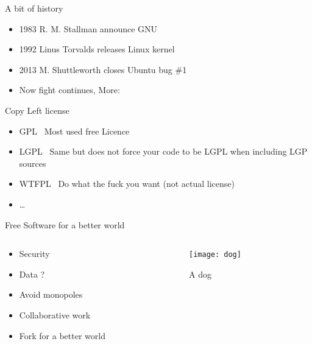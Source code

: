 \documentclass[xcolor={usenames,dvipsnames}]{beamer}
\begin{document}
\begin{frame}{A bit of history}
    \begin{itemize}[<+->]
        \item 1983 R. M. Stallman announce GNU~\cite{RMSWeb}
        \item 1992 Linus Torvalds releases Linux kernel~\cite{Linux}
        \item 2013 M. Shuttleworth closes Ubuntu bug \#1~\cite{Bug1}
        \item Now fight continues, More:~\cite{fsfVideo}
    \end{itemize}
\end{frame}

\begin{frame}{Copy Left license}
    \begin{itemize}[<+->]
        \item GPL~\cite{GPL} Most used free Licence
        \item LGPL~\cite{LGPL} Same but does not force your code to be LGPL when including LGP sources
        \item WTFPL~\cite{WTFPL} Do what the fuck you want (not actual license)
        \item \dots
    \end{itemize}
\end{frame}


\begin{frame}{Free Software for a better world}
    \begin{columns}
        \begin{column}{.5\textwidth}
            \begin{itemize}[<+->]
                \item Security
                \item Data ?
                \item Avoid monopoles
                \item Collaborative work
                \item Fork for a better world
            \end{itemize}
        \end{column}
        \begin{column}{.5\textwidth}
            {
                \begin{figure}
                    \centering
                    \texttt{[image: dog]}
                    \caption{A dog~\cite{RMSDog}}
                \end{figure}
            }
        \end{column}
    \end{columns}
\end{frame}
\end{document}
